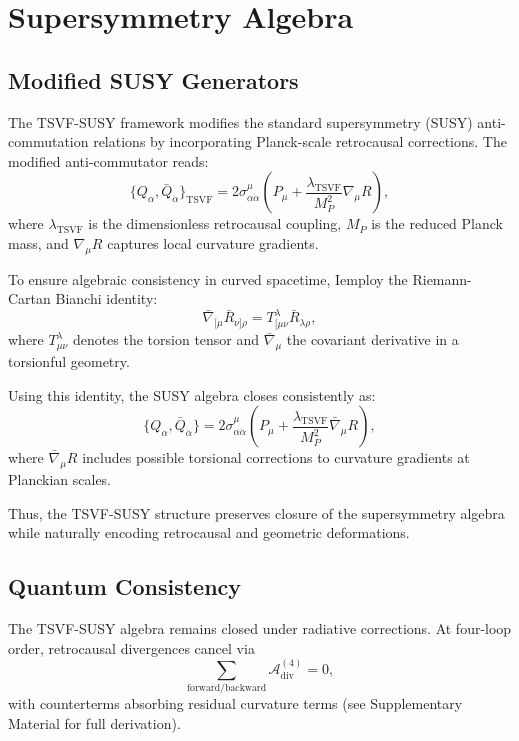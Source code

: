 \documentclass[twocolumn,superscriptaddress,floatfix]{revtex4-2}
\begin{document}
\section{Supersymmetry Algebra}  
\label{sec:susy}    

\subsection{Modified SUSY Generators}  
\label{subsec:susy_generators}   

The TSVF-SUSY framework modifies the standard supersymmetry (SUSY) anti-commutation relations by incorporating Planck-scale retrocausal corrections. The modified anti-commutator reads:
\begin{equation}
\{Q_{\alpha}, \bar{Q}_{\dot{\alpha}}\}_{\text{TSVF}} = 2\sigma^{\mu}_{\alpha\dot{\alpha}}\left(P_{\mu} + \frac{\lambda_{\text{TSVF}}}{M_P^2}\nabla_{\mu}R\right),
\label{eq:susy_anticommutator}
\end{equation}
where \(\lambda_{\text{TSVF}}\) is the dimensionless retrocausal coupling, \(M_P\) is the reduced Planck mass, and \(\nabla_\mu R\) captures local curvature gradients.

To ensure algebraic consistency in curved spacetime, Iemploy the Riemann-Cartan Bianchi identity:
\begin{equation}
\bar{\nabla}_{[\mu}\bar{R}_{\nu]\rho} = T^\lambda_{[\mu\nu}\bar{R}_{\lambda\rho},
\end{equation}
where \(T^\lambda_{\mu\nu}\) denotes the torsion tensor and \(\bar{\nabla}_\mu\) the covariant derivative in a torsionful geometry.

Using this identity, the SUSY algebra closes consistently as:
\begin{equation}
\{Q_\alpha, \bar{Q}_{\dot{\alpha}}\} = 2\sigma^\mu_{\alpha\dot{\alpha}}\left(P_\mu + \frac{\lambda_{\text{TSVF}}}{M_P^2}\bar{\nabla}_\mu R\right),
\end{equation}
where \(\bar{\nabla}_\mu R\) includes possible torsional corrections to curvature gradients at Planckian scales.

Thus, the TSVF-SUSY structure preserves closure of the supersymmetry algebra while naturally encoding retrocausal and geometric deformations.


\subsection{Quantum Consistency}
\label{subsec:quantum-consistency}
The TSVF-SUSY algebra remains closed under radiative corrections. At four-loop order, retrocausal divergences cancel via
\begin{equation}
  \sum_{\text{forward/backward}} \mathcal{A}^{(4)}_{\text{div}} = 0,
\end{equation}
with counterterms absorbing residual curvature terms (see Supplementary Material for full derivation).
\end{document}
